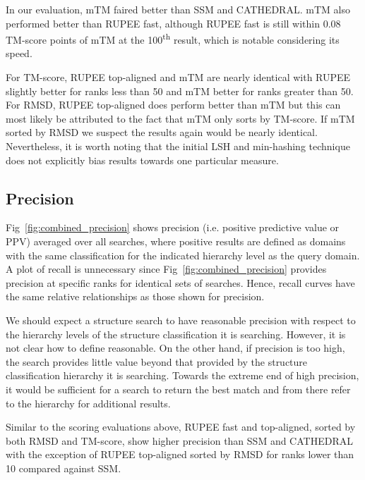 \documentclass[10pt,letterpaper]{article}
\renewcommand{\figurename}{Fig}
\begin{document}
In our evaluation, mTM faired better than SSM and CATHEDRAL. 
mTM also performed better than RUPEE fast, although RUPEE fast is still within 0.08 TM-score points of mTM at the 100\textsuperscript{th} result, which is notable considering its speed.

For TM-score, RUPEE top-aligned and mTM are nearly identical with RUPEE slightly better for ranks less than 50 and mTM better for ranks greater than 50. 
For RMSD, RUPEE top-aligned does perform better than mTM but this can most likely be attributed to the fact that mTM only sorts by TM-score. 
If mTM sorted by RMSD we suspect the results again would be nearly identical.
Nevertheless, it is worth noting that the initial LSH and min-hashing technique does not explicitly bias results towards one particular measure. 

\subsection*{Precision}

\figurename~\ref{fig:combined_precision} shows precision (i.e. positive predictive value or PPV) averaged over all searches, where positive results are defined as domains with the same classification for the indicated hierarchy level as the query domain. 
A plot of recall is unnecessary since \figurename~\ref{fig:combined_precision} provides precision at specific ranks for identical sets of searches. 
Hence, recall curves have the same relative relationships as those shown for precision. 

\begin{figure*}[!h]
\caption{Precision for RUPEE fast, RUPEE top-aligned sorted by TM-score, and RUPEE top-aligned sorted by RMSD}
\label{fig:combined_precision}
\end{figure*}

We should expect a structure search to have reasonable precision with respect to the hierarchy levels of the structure classification it is searching. 
However, it is not clear how to define reasonable. 
On the other hand, if precision is too high, the search provides little value beyond that provided by the structure classification hierarchy it is searching. 
Towards the extreme end of high precision, it would be sufficient for a search to return the best match and from there refer to the hierarchy for additional results. 

Similar to the scoring evaluations above, RUPEE fast and top-aligned, sorted by both RMSD and TM-score, show higher precision than SSM and CATHEDRAL with the exception of RUPEE top-aligned sorted by RMSD for ranks lower than 10 compared against SSM. 
\end{document}
